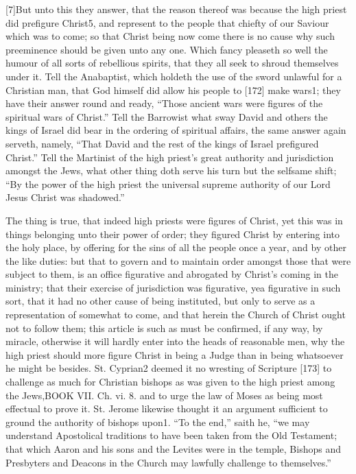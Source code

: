 [7]But unto this they answer, that the reason thereof was because the high priest did prefigure Christ5, and represent to the people that chiefty of our Saviour which was to come; so that Christ being now come there is no cause why such preeminence should be given unto any one. Which fancy pleaseth so well the humour of all sorts of rebellious spirits, that they all seek to shroud themselves under it. Tell the Anabaptist, which holdeth the use of the sword unlawful for a Christian man, that God himself did allow his people to [172] make wars1; they have their answer round and ready, “Those ancient wars were figures of the spiritual wars of Christ.” Tell the Barrowist what sway David and others the kings of Israel did bear in the ordering of spiritual affairs, the same answer again serveth, namely, “That David and the rest of the kings of Israel prefigured Christ.” Tell the Martinist of the high priest’s great authority and jurisdiction amongst the Jews, what other thing doth serve his turn but the selfsame shift; “By the power of the high priest the universal supreme authority of our Lord Jesus Christ was shadowed.”

The thing is true, that indeed high priests were figures of Christ, yet this was in things belonging unto their power of order; they figured Christ by entering into the holy place, by offering for the sins of all the people once a year, and by other the like duties: but that to govern and to maintain order amongst those that were subject to them, is an office figurative and abrogated by Christ’s coming in the ministry; that their exercise of jurisdiction was figurative, yea figurative in such sort, that it had no other cause of being instituted, but only to serve as a representation of somewhat to come, and that herein the Church of Christ ought not to follow them; this article is such as must be confirmed, if any way, by miracle, otherwise it will hardly enter into the heads of reasonable men, why the high priest should more figure Christ in being a Judge than in being whatsoever he might be besides. St. Cyprian2 deemed it no wresting of Scripture [173] to challenge as much for Christian bishops as was given to the high priest among the Jews,BOOK VII. Ch. vi. 8. and to urge the law of Moses as being most effectual to prove it. St. Jerome likewise thought it an argument sufficient to ground the authority of bishops upon1. “To the end,” saith he, “we may understand Apostolical traditions to have been taken from the Old Testament; that which Aaron and his sons and the Levites were in the temple, Bishops and Presbyters and Deacons in the Church may lawfully challenge to themselves.”

